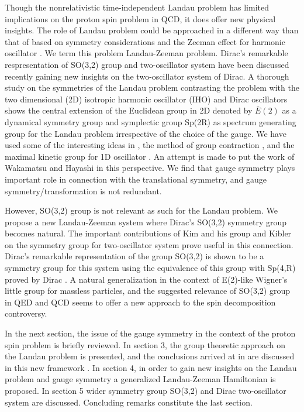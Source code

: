 \documentclass[aps, singlecolumn, showpacs]{revtex4-2}
\begin{document}
Though the nonrelativistic time-independent Landau problem has limited implications on the proton spin problem in QCD, it does offer new physical insights. The role of Landau problem could be approached in a different way than that of \cite{7,8} based on symmetry considerations and the Zeeman effect for harmonic oscillator \cite{14}. We term this problem Landau-Zeeman problem. Dirac's remarkable respresentation of SO(3,2) group \cite{15} and two-oscillator system have been discussed recently \cite{16} gaining new insights on the two-oscillator system of Dirac. A thorough study on the symmetries of the Landau problem contrasting the problem with the two dimensional (2D) isotropic harmonic oscillator (IHO) and Dirac oscillators shows the central extension of the Euclidean group in 2D denoted by $\bar{E}(2)$  as a dynamical symmetry group and symplectic group Sp(2R) as spectrum generating group for the Landau problem irrespective of the choice of the gauge. We have used some of the interesting ideas in \cite{17,18,19}, the method of group contraction \cite{20}, and the maximal kinetic group for 1D oscillator \cite{21}. An attempt is made to put the work of Wakamatsu and Hayashi \cite{8} in this perspective. We find that gauge symmetry plays important role in connection with the translational symmetry, and gauge symmetry/transformation is not redundant.

However, SO(3,2) group is not relevant as such for the Landau problem. We propose a new Landau-Zeeman system where Dirac's SO(3,2) symmetry group becomes natural. The important contributions of Kim and his group \cite{17} and Kibler \cite{18} on the symmetry group for two-oscillator system prove useful in this connection.  Dirac's remarkable representation of the group SO(3,2) is shown to be a symmetry group for this system using the equivalence of this group with Sp(4,R) proved by Dirac \cite{15}. A natural generalization in the context of E(2)-like Wigner's little group for massless particles, and the suggested relevance of SO(3,2) group in QED and QCD seems to offer a new approach to the spin decomposition controversy.

In the next section, the issue of the gauge symmetry in the context of the proton spin problem is briefly reviewed.  In section 3, the group theoretic approach on the Landau problem is presented, and the conclusions arrived at in \cite{8} are discussed in this new framework \cite{16}.  In section 4, in order to gain new insights on the Landau problem and gauge symmetry a generalized Landau-Zeeman Hamiltonian is proposed. In section 5 wider symmetry group SO(3,2) and Dirac two-oscillator system are discussed. Concluding remarks constitute the last section.
\end{document}
